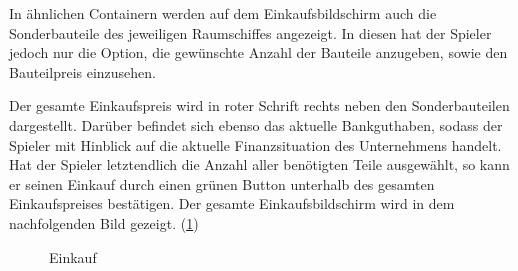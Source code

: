 In ähnlichen Containern werden auf dem Einkaufsbildschirm auch die Sonderbauteile des jeweiligen Raumschiffes angezeigt. In diesen hat der Spieler jedoch nur die Option, die gewünschte Anzahl der Bauteile anzugeben, sowie den Bauteilpreis einzusehen.
 
Der gesamte Einkaufspreis wird in roter Schrift rechts neben den Sonderbauteilen dargestellt. Darüber befindet sich ebenso das aktuelle Bankguthaben, sodass der Spieler mit Hinblick auf die aktuelle Finanzsituation des Unternehmens handelt. Hat der Spieler letztendlich die Anzahl aller benötigten Teile ausgewählt, so kann er seinen Einkauf durch einen grünen Button unterhalb des gesamten Einkaufspreises bestätigen. Der gesamte Einkaufsbildschirm wird in dem nachfolgenden Bild gezeigt. (\ref{img:ui-einkauf})

\begin{figure}[h]
  \centering
  \caption{Einkauf}
  \label{img:ui-einkauf}
\end{figure}

\autorende{}